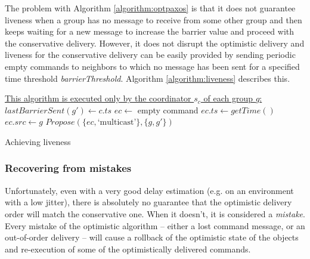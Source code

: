 \documentclass[times, 10pt]{article}
\begin{document}
The problem with Algorithm \ref{algorithm:optpaxos} is that it does not guarantee liveness when a group has no message to receive from some other group and then keeps waiting for a new message to increase the barrier value and proceed with the conservative delivery. However, it does not disrupt the optimistic delivery and liveness for the conservative delivery can be easily provided by sending periodic empty commands to neighbors to which no message has been sent for a specified time threshold \textit{barrierThreshold}. Algorithm \ref{algorithm:liveness} describes this.

\begin{algorithm}
\begin{distribalgo}[1]
\STATE \underline{This algorithm is executed only by the coordinator $s_c$ of each group $g$:}
\STATE
{}
    \STATE $lastBarrierSent(g') \leftarrow c.ts$
  \ENDINDENT
\ENDINDENT
\STATE
{}
  \STATE $ec \leftarrow$ empty command
  \STATE $ec.ts \leftarrow getTime()$
  \STATE $ec.src \leftarrow g$
  \STATE $Propose(\{ec, \text{`multicast'}\}, \{g,g'\})$
\ENDINDENT
\STATE

\caption{Achieving liveness}
\label{algorithm:liveness}
\end{distribalgo}
\end{algorithm}



\subsubsection{Recovering from mistakes}

Unfortunately, even with a very good delay estimation (e.g. on an environment with a low jitter), there is absolutely no guarantee that the optimistic delivery order will match the conservative one. When it doesn't, it is considered a \emph{mistake}. Every mistake of the optimistic algorithm -- either a lost command message, or an out-of-order delivery -- will cause a rollback of the optimistic state of the objects and re-execution of some of the optimistically delivered commands.
\end{document}
